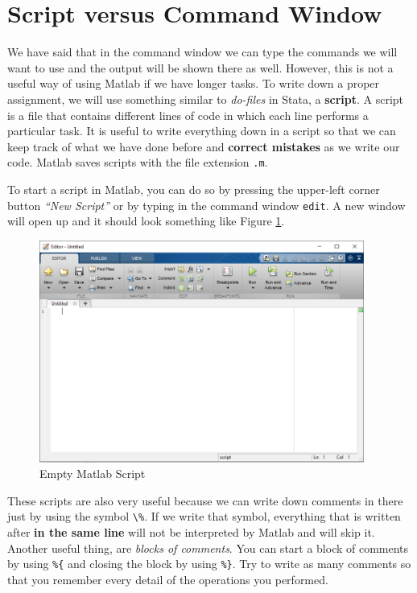 \documentclass[a4paper,11pt]{article}
\begin{document}
\section{Script versus Command Window}

We have said that in the command window we can type the commands we will want to use and the output will be shown there as well. However, this is not a useful way of using Matlab if we have longer tasks. To write down a proper assignment, we will use something similar to \textit{do-files} in Stata, a \textbf{script}. A script is a file that contains different lines of code in which each line performs a particular task. It is useful to write everything down in a script so that we can keep track of what we have done before and \textbf{correct mistakes} as we write our code. Matlab saves scripts with the file extension \verb;.m;.

To start a script in Matlab, you can do so by pressing the upper-left corner button \textit{``New Script''} or by typing in the command window \verb;edit;. A new window will open up and it should look something like Figure \ref{script}.

\begin{figure}
\centering
	\includegraphics[width = 0.95\textwidth]{script1.png}
	\caption{Empty Matlab Script}
	\label{script}
\end{figure} 

These scripts are also very useful because we can write down comments in there just by using the symbol \verb;\%;. If we write that symbol, everything that is written after \textbf{in the same line} will not be interpreted by Matlab and will skip it. Another useful thing, are \textit{blocks of comments}. You can start a block of comments by using \verb;%{; and closing the block by using \verb;%};. Try to write as many comments so that you remember every detail of the operations you performed.
\end{document}
